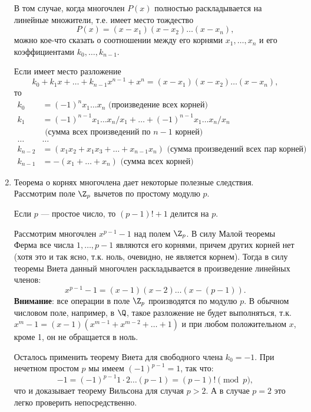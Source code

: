 \begin{enumerate}
В том случае, когда многочлен $P(x)$ полностью раскладывается на линейные множители, т.е. имеет место тождество
$$
P(x)= (x-x_1)(x-x_2)\dots(x-x_n),
$$
можно кое-что сказать о соотношении между его корнями $x_1,\dots,x_n$ и его коэффициентами $k_0,\dots,k_{n-1}$.
\begin{thrm}[Виет]
Если имеет место разложение
$$
k_0+k_1x+\dots+k_{n-1}x^{n-1}+x^n = (x-x_1)(x-x_2)\dots(x-x_n),
$$
то
\begin{align*}
k_0 & = (-1)^nx_1\dots x_n\mbox{  (произведение всех корней)} \\
k_1 & = (-1)^{n-1}x_1\dots x_n/x_1+\dots+(-1)^{n-1}x_1\dots x_n/x_n \\
    & \mbox{  (сумма всех произведений по\ $n-1$ корней)} \\
\dots & \dots \\
k_{n-2} & = (x_1x_2+x_1x_3+\dots + x_{n-1}x_n)\mbox{  (сумма произведений всех пар корней)} \\
k_{n-1} & = -(x_1+\dots+x_n) \mbox{  (сумма всех корней)}
\end{align*}
\end{thrm}

\item Теорема о корнях многочлена дает некоторые полезные следствия. Рассмотрим поле $\Z_p$ вычетов по простому модулю $p$.
\begin{thrm}[Вильсон]\label{Wilson}
Если $p$ --- простое число, то $(p-1)!+1$ делится на $p$.
\end{thrm}
\pf
Рассмотрим многочлен $x^{p-1}-1$ над полем $\Z_p$. В силу Малой теоремы Ферма все числа $1,\dots,p-1$ являются его корнями, причем других корней нет (хотя это и так ясно, т.к. ноль, очевидно, не является корнем). Тогда в силу теоремы Виета данный многочлен раскладывается в произведение линейных членов:
$$
x^{p-1}-1 = (x-1)(x-2)\dots (x-(p-1)).
$$
\textbf{Внимание}: все операции в поле $\Z_p$ производятся по модулю $p$. В обычном числовом поле, например, в $\Q$, такое разложение не будет выполняться, т.к. $x^m-1=(x-1)(x^{m-1}+x^{m-2}+\dots+1)$ и при любом положительном $x$, кроме 1, он не обращается в ноль.

Осталось применить теорему Виета для свободного члена $k_0=-1$. При нечетном простом $p$ мы имеем $(-1)^{p-1}=1$, так что:
$$
-1=(-1)^{p-1}1\cdot 2\dots(p-1)=(p-1)!\pmod p,
$$
что и доказывает теорему Вильсона для случая $p>2$. А в случае $p=2$ это легко проверить непосредственно.
\epf
\end{enumerate}



